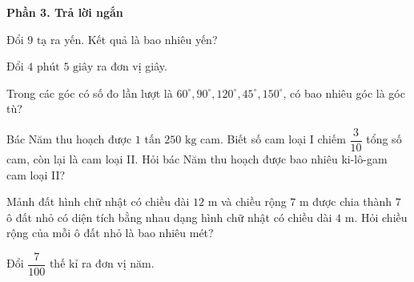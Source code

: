 \textbf{Phần 3. Trả lời ngắn}

\begin{ex} %
Đổi $9\text{ tạ}$ ra yến. Kết quả là bao nhiêu yến?
\end{ex}

\begin{ex} %
Đổi $4\text{ phút } 5\text{ giây}$ ra đơn vị giây.
\end{ex}

\begin{ex} %
Trong các góc có số đo lần lượt là $60^\circ, 90^\circ, 120^\circ, 45^\circ, 150^\circ$, có bao nhiêu góc là góc tù?
\end{ex}

\begin{ex} %
Bác Năm thu hoạch được $1\text{ tấn } 250\text{ kg}$ cam. Biết số cam loại I chiếm $\dfrac{3}{10}$ tổng số cam, còn lại là cam loại II. Hỏi bác Năm thu hoạch được bao nhiêu ki-lô-gam cam loại II?
\end{ex}

\begin{ex} %
Mảnh đất hình chữ nhật có chiều dài $12\text{ m}$ và chiều rộng $7\text{ m}$ được chia thành $7$ ô đất nhỏ có diện tích bằng nhau dạng hình chữ nhật có chiều dài $4\text{ m}$. Hỏi chiều rộng của mỗi ô đất nhỏ là bao nhiêu mét?
\end{ex}

\begin{ex} %
Đổi $\dfrac{7}{100}\text{ thế kỉ}$ ra đơn vị năm.
\end{ex}
